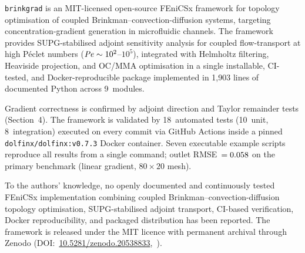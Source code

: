 \texttt{brinkgrad} is an MIT-licensed open-source FEniCSx framework
for topology optimisation of coupled Brinkman--convection-diffusion
systems, targeting concentration-gradient generation
in microfluidic channels.
The framework provides SUPG-stabilised adjoint sensitivity analysis
for coupled flow-transport at high P\'{e}clet numbers
($\mathit{Pe}\sim10^2$--$10^5$), integrated with Helmholtz filtering,
Heaviside projection, and OC/MMA optimisation
in a single installable, CI-tested, and Docker-reproducible package
implemented in 1{,}903 lines of documented Python across 9~modules.

Gradient correctness is confirmed by adjoint direction
and Taylor remainder tests (Section~4).
The framework is validated by 18~automated tests
(10~unit, 8~integration) executed on every commit
via GitHub Actions inside a pinned
\texttt{dolfinx/dolfinx:v0.7.3} Docker container.
Seven executable example scripts reproduce all results
from a single command; outlet RMSE~$=0.058$ on the
primary benchmark (linear gradient, $80\times20$ mesh).

To the authors' knowledge, no openly documented and
continuously tested FEniCSx implementation combining
coupled Brinkman--convection-diffusion topology optimisation,
SUPG-stabilised adjoint transport, CI-based verification,
Docker reproducibility, and packaged distribution has been reported.
The framework is released under the MIT licence with permanent
archival through Zenodo
(DOI:~\href{https://doi.org/10.5281/zenodo.20538833}{10.5281/zenodo.20538833},~\cite{micrograd2025zenodo}).
